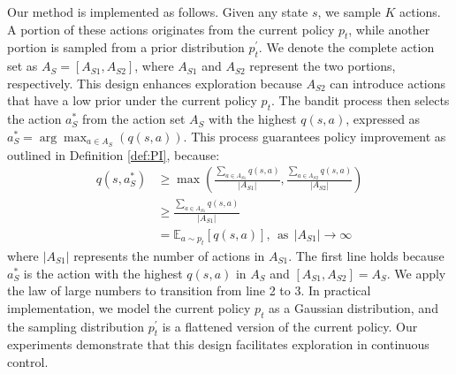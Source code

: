 Our method is implemented as follows. Given any state \( s \), we sample \( K \) actions. A portion of these actions originates from the current policy \( p_t \), while another portion is sampled from a prior distribution \( p^\prime_t \). We denote the complete action set as \( A_S = [A_{S1}, A_{S2}] \), where \( A_{S1} \) and \( A_{S2} \) represent the two portions, respectively. This design enhances exploration because \( A_{S2} \) can introduce actions that have a low prior under the current policy \( p_t \). 
The bandit process then selects the action \( a^*_S \) from the action set \( A_S \) with the highest \( q(s,a) \), expressed as \( a^*_S = \arg\max_{a \in A_S}(q(s,a)) \). This process guarantees policy improvement as outlined in Definition \ref{def:PI}, because:
\begin{equation}
\label{q_pi}
\begin{split}
    q(s,a^*_S ) & \geq \max \left( \frac{\sum_{a \in A_{S1}} q(s,a)}{|A_{S1}|}, \frac{\sum_{a \in A_{S2}} q(s,a)}{|A_{S2}|}  \right) \\
    & \geq \frac{\sum_{a \in A_{S1}} q(s,a)}{|A_{S1}|} \\
    & = \mathbb{E}_{a\sim p_t }[q(s, a)] , \ \  \text{as} \ \  |A_{S1}| \rightarrow \infty
\end{split}
\end{equation}
where \( |A_{S1}| \) represents the number of actions in \( A_{S1} \). The first line holds because \( a^*_S \) is the action with the highest \( q(s,a) \) in \( A_S \) and \( [A_{S1}, A_{S2}] = A_S \). We apply the law of large numbers to transition from line 2 to 3.
In practical implementation, we model the current policy \( p_t \) as a Gaussian distribution, and the sampling distribution \( p^\prime_t \) is a flattened version of the current policy. Our experiments demonstrate that this design facilitates exploration in continuous control.

